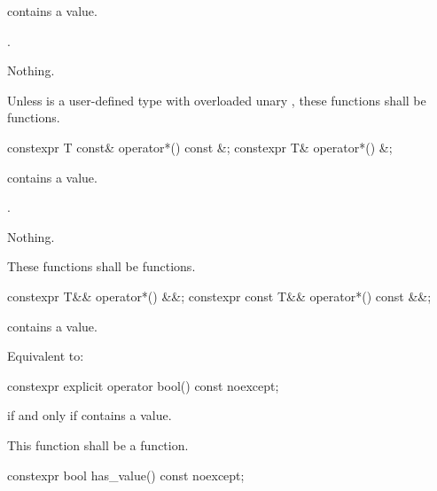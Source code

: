 \begin{itemdescr}
\pnum
\requires
{} contains a value.

\pnum
\returns
{}.

\pnum
\throws
Nothing.

\pnum
\remarks
Unless  is a user-defined type with overloaded unary , these functions shall be  functions.
\end{itemdescr}

%
\begin{itemdecl}
constexpr T const& operator*() const &;
constexpr T& operator*() &;
\end{itemdecl}

\begin{itemdescr}
\pnum
\requires
{} contains a value.

\pnum
\returns
{}.

\pnum
\throws
Nothing.

\pnum
\remarks
These functions shall be  functions.
\end{itemdescr}

%
\begin{itemdecl}
constexpr T&& operator*() &&;
constexpr const T&& operator*() const &&;
\end{itemdecl}

\begin{itemdescr}
\pnum
\requires
{} contains a value.

\pnum
\effects
Equivalent to: 
\end{itemdescr}

%
\begin{itemdecl}
constexpr explicit operator bool() const noexcept;
\end{itemdecl}

\begin{itemdescr}
\pnum
\returns
{} if and only if  contains a value.

\pnum
\remarks
This function shall be a  function.
\end{itemdescr}

%
\begin{itemdecl}
constexpr bool has_value() const noexcept;
\end{itemdecl}

